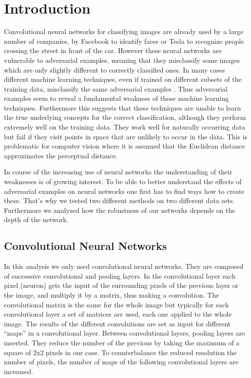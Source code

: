\documentclass[%
 reprint,
 amsmath,amssymb,
 aps,
]{revtex4-1}
\begin{document}

\section{Introduction}

Convolutional neural networks for classifying images are already used by a large number of companies, by Facebook to identify faces or Tesla to recognize people crossing the street in front of the car. 
However these neural networks are vulnerable to adversarial examples, meaning that they misclassify some images which are only slightly different to correctly classified ones. In many cases different machine learning techniques, even if trained on different subsets of the training data, misclassify the same adversarial examples \cite{paperGrad}. Thus adversarial examples seem to reveal a fundamental weakness of those machine learning techniques. Furthermore this suggests that these techniques are unable to learn the true underlying concepts for the correct classification, although they perform extremely well on the training data. They work well for naturally occurring data but fail if they visit points in space that are unlikely to occur in the data. This is problematic for computer vision where it is assumed that the Euclidean distance approximates the perceptual distance.

In course of the increasing use of neural networks the understanding of their weaknesses is of growing interest. To be able to better understand the effects of adversarial examples on neural networks one first has to find ways how to create these. That's why we tested two different methods on two different data sets. Furthermore we analyzed how the robustness of our networks depends on the depth of the network.

\subsection{Convolutional Neural Networks}


In this analysis we only used convolutional neural networks. They are composed of successive convolutional and pooling layers. In the convolutional layer each pixel (neuron) gets the input of the surrounding pixels of the previous layer or the image, and multiply it by a matrix, thus making a convolution. The convolutional matrix is the same for the whole image but typically for each convolutional layer a set of matrices are used, each one applied to the whole image. The results of the different convolutions are set as input for different ``maps'' in a convolutional layer. Between convolutional layers, pooling layers are inserted. They reduce the number of the previous by taking the maximum of a square of 2x2 pixels in our case. To counterbalance the reduced resolution the number of pixels, the number of maps of the following convolutional layers are increased.
\end{document}
